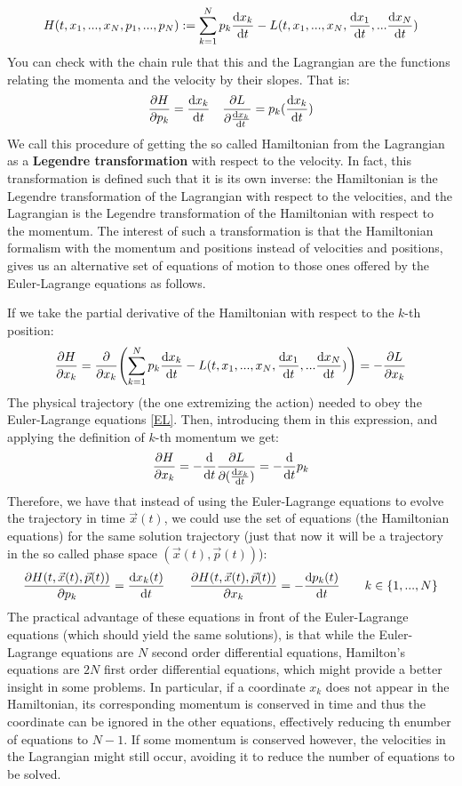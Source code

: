\documentclass[11pt, a4paper]{article} %
\begin{document}
\begin{equation}
H(t, x_1,...,x_N,p_1,...,p_N):=\sum_{k=1}^N p_k \dv{x_k}{t} (p_k)-L(t, x_1,...,x_N, \dv{x_1}{t} (p_1),... \dv{x_N}{t} (p_N))
\end{equation}
You can check with the chain rule that this and the Lagrangian are the functions relating the momenta and the velocity by their slopes. That is:
\begin{equation}
\pdv{H}{p_k}=\dv{x_k}{t}(p_k)\quad \pdv{L}{\dv{x_k}{t}}=p_k(\dv{x_k}{t})
\end{equation}
We call this procedure of getting the so called Hamiltonian from the Lagrangian as a {\bf Legendre transformation} with respect to the velocity. In fact, this transformation is defined such that it is its own inverse: the Hamiltonian is the Legendre transformation of the Lagrangian with respect to the velocities, and the Lagrangian is the Legendre transformation of the Hamiltonian with respect to the momentum. The interest of such a transformation is that the Hamiltonian formalism with the momentum and positions instead of velocities and positions, gives us an alternative set of equations of motion to those ones offered by the Euler-Lagrange equations as follows.

If we take the partial derivative of the Hamiltonian with respect to the $k$-th position:
\begin{equation}
\pdv{H}{x_k}=\pdv{}{x_k}\qty(\sum_{k=1}^N p_k \dv{x_k}{t} (p_k)-L(t, x_1,...,x_N, \dv{x_1}{t} (p_1),... \dv{x_N}{t} (p_N)))=-\pdv{L}{x_k}
\end{equation}
The physical trajectory (the one extremizing the action) needed to obey the Euler-Lagrange equations \eqref{EL}. Then, introducing them in this expression, and applying the definition of $k$-th momentum we get:
\begin{equation}
\pdv{H}{x_k}=-\dv{}{t}\pdv{L}{(\dv{x_k}{t})}=-\dv{}{t}p_k
\end{equation}
Therefore, we have that instead of using the Euler-Lagrange equations to evolve the trajectory in time $\vec{x}(t)$, we could use the set of equations (the Hamiltonian equations) for the same solution trajectory (just that now it will be a trajectory in the so called phase space $(\vec{x}(t), \vec{p}(t))$):
\begin{equation}
\pdv{H(t,\vec{x}(t),\vec{p}(t))}{p_k}=\dv{x_k(t)}{t}\quad\quad \pdv{H(t,\vec{x}(t),\vec{p}(t))}{x_k}=-\dv{p_k(t)}{t}\quad \quad k\in\{1,...,N\}
\end{equation}
The practical advantage of these equations in front of the Euler-Lagrange equations (which should yield the same solutions), is that while the Euler-Lagrange equations are $N$ second order differential equations, Hamilton's equations are $2N$ first order differential equations, which might provide a better insight in some problems. In particular, if a coordinate $x_k$ does not appear in the Hamiltonian, its corresponding momentum is conserved in time and thus the coordinate can be ignored in the other equations, effectively reducing th enumber of equations to $N-1$. If some momentum is conserved however, the velocities in the Lagrangian might still occur, avoiding it to reduce the number of equations to be solved.
\end{document}

